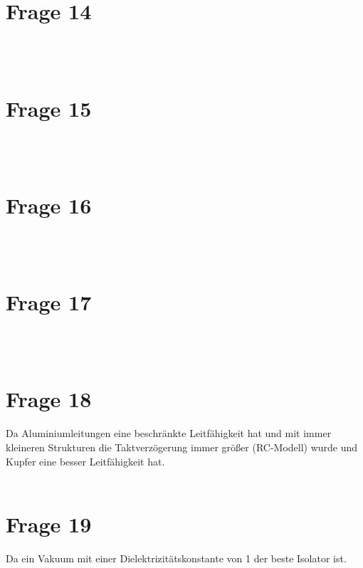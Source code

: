 \documentclass[a4paper]{scrartcl}
\begin{document}
\section*{Frage 14}

~\\
~\\
\section*{Frage 15}

~\\
~\\
\section*{Frage 16}

~\\
~\\
\section*{Frage 17}

~\\
~\\
\section*{Frage 18}
Da Aluminiumleitungen eine beschränkte Leitfähigkeit hat und mit immer kleineren Strukturen die Taktverzögerung immer größer (RC-Modell) wurde und Kupfer eine besser Leitfähigkeit hat.
~\\
~\\
\section*{Frage 19}
Da ein Vakuum mit einer Dielektrizitätskonstante von 1 der beste Isolator ist.
~\\
~\\
\end{document}

